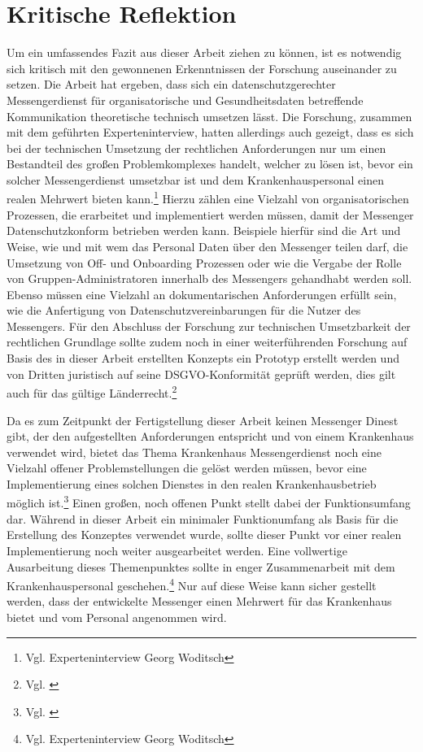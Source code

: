 \section{Kritische Reflektion}\label{chapter:kr}
Um ein umfassendes Fazit aus dieser Arbeit ziehen zu können, ist es notwendig sich kritisch mit den gewonnenen Erkenntnissen der Forschung auseinander zu setzen. Die Arbeit hat ergeben, dass sich ein datenschutzgerechter Messengerdienst für organisatorische und Gesundheitsdaten betreffende Kommunikation theoretische technisch umsetzen lässt. Die Forschung, zusammen mit dem geführten Experteninterview, hatten allerdings auch gezeigt, dass es sich bei der technischen Umsetzung der rechtlichen Anforderungen nur um einen Bestandteil des großen Problemkomplexes handelt, welcher zu lösen ist, bevor ein solcher Messengerdienst umsetzbar ist und dem Krankenhauspersonal einen realen Mehrwert bieten kann.\footnote{Vgl. Experteninterview Georg Woditsch} Hierzu zählen eine Vielzahl von organisatorischen Prozessen, die erarbeitet und implementiert werden müssen, damit der Messenger Datenschutzkonform betrieben werden kann. Beispiele hierfür sind die Art und Weise, wie und mit wem das Personal Daten über den Messenger teilen darf, die Umsetzung von Off- und Onboarding Prozessen oder wie die Vergabe der Rolle von Gruppen-Administratoren innerhalb des Messengers gehandhabt werden soll. Ebenso müssen eine Vielzahl an dokumentarischen Anforderungen erfüllt sein, wie die Anfertigung von Datenschutzvereinbarungen für die Nutzer des Messengers.
Für den Abschluss der Forschung zur technischen Umsetzbarkeit der rechtlichen Grundlage sollte zudem noch in einer weiterführenden Forschung auf Basis des in dieser Arbeit erstellten Konzepts ein Prototyp erstellt werden und von Dritten juristisch auf seine DSGVO-Konformität geprüft werden, dies gilt auch für das gültige Länderrecht.\footnote{Vgl. \cite[S. 8 ff.]{Bundesverband-Gesundheits-IT-e.V.2016}}

Da es zum Zeitpunkt der Fertigstellung dieser Arbeit keinen Messenger Dinest gibt, der den aufgestellten Anforderungen entspricht und von einem Krankenhaus verwendet wird, bietet das Thema Krankenhaus Messengerdienst noch eine Vielzahl offener Problemstellungen die gelöst werden müssen, bevor eine Implementierung eines solchen Dienstes in den realen Krankenhausbetrieb möglich ist.\footnote{Vgl. \cite[S. 1 ff.]{Datenschutzkonferenz2019}}
Einen großen, noch offenen Punkt stellt dabei der Funktionsumfang dar. Während in dieser Arbeit ein minimaler Funktionumfang als Basis für die Erstellung des Konzeptes verwendet wurde, sollte dieser Punkt vor einer realen Implementierung noch weiter ausgearbeitet werden. Eine vollwertige Ausarbeitung dieses Themenpunktes sollte in enger Zusammenarbeit mit dem Krankenhauspersonal geschehen.\footnote{Vgl. Experteninterview Georg Woditsch} Nur auf diese Weise kann sicher gestellt werden, dass der entwickelte Messenger einen Mehrwert für das Krankenhaus bietet und vom Personal angenommen wird.

